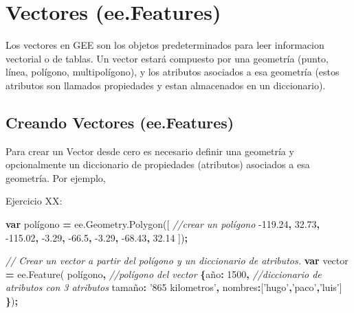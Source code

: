 \documentclass[
]{article}
\newenvironment{Shaded}{\begin{snugshade}}{\end{snugshade}}
\newcommand{\AttributeTok}[1]{\textcolor[rgb]{0.77,0.63,0.00}{#1}}
\newcommand{\CommentTok}[1]{\textcolor[rgb]{0.56,0.35,0.01}{\textit{#1}}}
\newcommand{\DataTypeTok}[1]{\textcolor[rgb]{0.13,0.29,0.53}{#1}}
\newcommand{\DecValTok}[1]{\textcolor[rgb]{0.00,0.00,0.81}{#1}}
\newcommand{\FloatTok}[1]{\textcolor[rgb]{0.00,0.00,0.81}{#1}}
\newcommand{\KeywordTok}[1]{\textcolor[rgb]{0.13,0.29,0.53}{\textbf{#1}}}
\newcommand{\NormalTok}[1]{#1}
\newcommand{\OperatorTok}[1]{\textcolor[rgb]{0.81,0.36,0.00}{\textbf{#1}}}
\newcommand{\StringTok}[1]{\textcolor[rgb]{0.31,0.60,0.02}{#1}}
\newcommand{\VariableTok}[1]{\textcolor[rgb]{0.00,0.00,0.00}{#1}}
\begin{document}
\newpage

\hypertarget{vectores-ee.features}{%
\section{Vectores (ee.Features)}\label{vectores-ee.features}}

Los vectores en GEE son los objetos predeterminados para leer
informacion vectorial o de tablas. Un vector estará compuesto por una
geometría (punto, línea, polígono, multipolígono), y los atributos
asociados a esa geometría (estos atributos son llamados propiedades y
estan almacenados en un diccionario).

\hypertarget{creando-vectores-ee.features}{%
\subsection{Creando Vectores
(ee.Features)}\label{creando-vectores-ee.features}}

Para crear un Vector desde cero es necesario definir una geometría y
opcionalmente un diccionario de propiedades (atributos) asociados a esa
geometría. Por ejemplo,

Ejercicio XX:

\begin{Shaded}
\begin{Highlighting}[]
\KeywordTok{var}\NormalTok{ polígono }\OperatorTok{=} \VariableTok{ee}\NormalTok{.}\VariableTok{Geometry}\NormalTok{.}\AttributeTok{Polygon}\NormalTok{([ }\CommentTok{//crear un polígono}
  \FloatTok{-119.24}\OperatorTok{,} \FloatTok{32.73}\OperatorTok{,}
  \FloatTok{-115.02}\OperatorTok{,} \FloatTok{-3.29}\OperatorTok{,}
  \FloatTok{-66.5}\OperatorTok{,} \FloatTok{-3.29}\OperatorTok{,}
  \FloatTok{-68.43}\OperatorTok{,} \FloatTok{32.14}
\NormalTok{])}\OperatorTok{;}

\CommentTok{// Crear un vector a partir del polígono y un diccionario de atributos.}
\KeywordTok{var}\NormalTok{ vector }\OperatorTok{=} \VariableTok{ee}\NormalTok{.}\AttributeTok{Feature}\NormalTok{(}
\NormalTok{  polígono}\OperatorTok{,}                       \CommentTok{//polígono del vector}
  \OperatorTok{\{}\DataTypeTok{año}\OperatorTok{:} \DecValTok{1500}\OperatorTok{,}                     \CommentTok{//diccionario de atributos con 3 atributos}
  \DataTypeTok{tamaño}\OperatorTok{:} \StringTok{'865 kilometros'}\OperatorTok{,}
  \DataTypeTok{nombres}\OperatorTok{:}\NormalTok{[}\StringTok{'hugo'}\OperatorTok{,}\StringTok{'paco'}\OperatorTok{,}\StringTok{'luis'}\NormalTok{]}
  \OperatorTok{\}}\NormalTok{)}\OperatorTok{;}
\end{Highlighting}
\end{Shaded}
\end{document}
